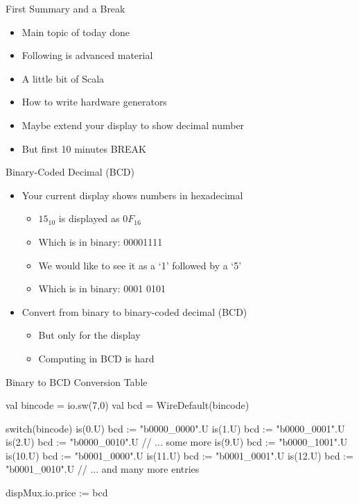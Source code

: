 \begin{frame}[fragile]{First Summary and a Break}
\begin{itemize}
\item Main topic of today done
\item Following is advanced material
\item A little bit of Scala
\item How to write hardware generators
\item Maybe extend your display to show decimal number
\item But first 10 minutes BREAK
\end{itemize}
\end{frame}


\begin{frame}[fragile]{Binary-Coded Decimal (BCD)}
\begin{itemize}
\item Your current display shows numbers in hexadecimal
\begin{itemize}
\item $15_{10}$ is displayed as $0F_{16}$
\item Which is in binary: 00001111
\item We would like to see it as a `1' followed by a `5'
\item Which is in binary: 0001 0101
\end{itemize}
\item Convert from binary to binary-coded decimal (BCD)
\begin{itemize}
\item But only for the display
\item Computing in BCD is hard
\end{itemize}
\end{itemize}
\end{frame}

\begin{frame}[fragile]{Binary to BCD Conversion Table}
\begin{chisel}
  val bincode = io.sw(7,0)
  val bcd = WireDefault(bincode)

  switch(bincode) {
    is(0.U) { bcd := "b0000_0000".U }
    is(1.U) { bcd := "b0000_0001".U }
    is(2.U) { bcd := "b0000_0010".U }
    // ... some more
    is(9.U) { bcd := "b0000_1001".U }
    is(10.U) { bcd := "b0001_0000".U }
    is(11.U) { bcd := "b0001_0001".U }
    is(12.U) { bcd := "b0001_0010".U }
    // ... and many more entries
  }

  dispMux.io.price := bcd
\end{chisel}
\end{frame}

